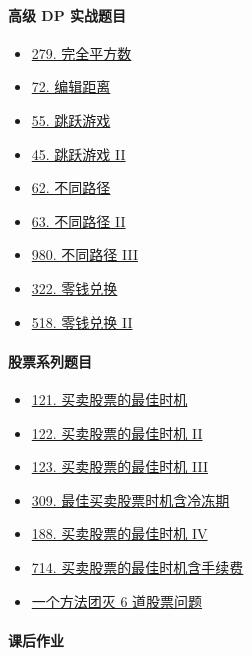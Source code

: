 \paragraph{高级 DP 实战题目}

\begin{itemize}
  \item \hyperref[leetcode:279]{279. 完全平方数}
  \item \hyperref[leetcode:72]{72. 编辑距离}
  \item \hyperref[leetcode:55]{55. 跳跃游戏}
  \item \hyperref[leetcode:45]{45. 跳跃游戏 II}
  \item \hyperref[leetcode:62]{62. 不同路径}
  \item \hyperref[leetcode:63]{63. 不同路径 II}
  \item \hyperref[leetcode:980]{980. 不同路径 III}
  \item \hyperref[leetcode:322]{322. 零钱兑换}
  \item \hyperref[leetcode:518]{518. 零钱兑换 II}
\end{itemize}

\paragraph{股票系列题目}

\begin{itemize}
  \item \hyperref[leetcode:121]{121. 买卖股票的最佳时机}
  \item \hyperref[leetcode:122]{122. 买卖股票的最佳时机 II}
  \item \hyperref[leetcode:123]{123. 买卖股票的最佳时机 III}
  \item \hyperref[leetcode:309]{309. 最佳买卖股票时机含冷冻期}
  \item \hyperref[leetcode:188]{188. 买卖股票的最佳时机 IV}
  \item \hyperref[leetcode:714]{714. 买卖股票的最佳时机含手续费}
  \item \hyperref[leetcode:714]{一个方法团灭 6 道股票问题}
\end{itemize}

\paragraph{课后作业}

